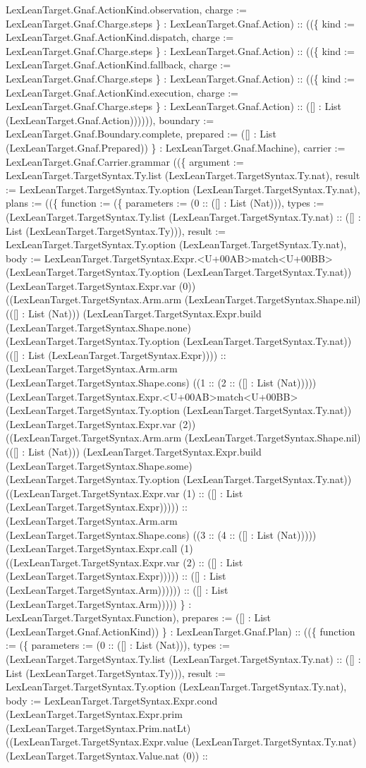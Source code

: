 \documentclass[11pt]{article}
\begin{document}
LexLeanTarget.Gnaf.ActionKind.observation, charge := LexLeanTarget.Gnaf.Charge.steps \} : LexLeanTarget.Gnaf.Action) :: ((\{ kind := LexLeanTarget.Gnaf.ActionKind.dispatch, charge := LexLeanTarget.Gnaf.Charge.steps \} : LexLeanTarget.Gnaf.Action) :: ((\{ kind := LexLeanTarget.Gnaf.ActionKind.fallback, charge := LexLeanTarget.Gnaf.Charge.steps \} : LexLeanTarget.Gnaf.Action) :: ((\{ kind := LexLeanTarget.Gnaf.ActionKind.execution, charge := LexLeanTarget.Gnaf.Charge.steps \} : LexLeanTarget.Gnaf.Action) :: ([] : List (LexLeanTarget.Gnaf.Action)))))), boundary := LexLeanTarget.Gnaf.Boundary.complete, prepared := ([] : List (LexLeanTarget.Gnaf.Prepared)) \} : LexLeanTarget.Gnaf.Machine), carrier := LexLeanTarget.Gnaf.Carrier.grammar ((\{ argument := LexLeanTarget.TargetSyntax.Ty.list (LexLeanTarget.TargetSyntax.Ty.nat), result := LexLeanTarget.TargetSyntax.Ty.option (LexLeanTarget.TargetSyntax.Ty.nat), plans := ((\{ function := (\{ parameters := (0 :: ([] : List (Nat))), types := (LexLeanTarget.TargetSyntax.Ty.list (LexLeanTarget.TargetSyntax.Ty.nat) :: ([] : List (LexLeanTarget.TargetSyntax.Ty))), result := LexLeanTarget.TargetSyntax.Ty.option (LexLeanTarget.TargetSyntax.Ty.nat), body := LexLeanTarget.TargetSyntax.Expr.<U+00AB>match<U+00BB> (LexLeanTarget.TargetSyntax.Ty.option (LexLeanTarget.TargetSyntax.Ty.nat)) (LexLeanTarget.TargetSyntax.Expr.var (0)) ((LexLeanTarget.TargetSyntax.Arm.arm (LexLeanTarget.TargetSyntax.Shape.nil) (([] : List (Nat))) (LexLeanTarget.TargetSyntax.Expr.build (LexLeanTarget.TargetSyntax.Shape.none) (LexLeanTarget.TargetSyntax.Ty.option (LexLeanTarget.TargetSyntax.Ty.nat)) (([] : List (LexLeanTarget.TargetSyntax.Expr)))) :: (LexLeanTarget.TargetSyntax.Arm.arm (LexLeanTarget.TargetSyntax.Shape.cons) ((1 :: (2 :: ([] : List (Nat))))) (LexLeanTarget.TargetSyntax.Expr.<U+00AB>match<U+00BB> (LexLeanTarget.TargetSyntax.Ty.option (LexLeanTarget.TargetSyntax.Ty.nat)) (LexLeanTarget.TargetSyntax.Expr.var (2)) ((LexLeanTarget.TargetSyntax.Arm.arm (LexLeanTarget.TargetSyntax.Shape.nil) (([] : List (Nat))) (LexLeanTarget.TargetSyntax.Expr.build (LexLeanTarget.TargetSyntax.Shape.some) (LexLeanTarget.TargetSyntax.Ty.option (LexLeanTarget.TargetSyntax.Ty.nat)) ((LexLeanTarget.TargetSyntax.Expr.var (1) :: ([] : List (LexLeanTarget.TargetSyntax.Expr))))) :: (LexLeanTarget.TargetSyntax.Arm.arm (LexLeanTarget.TargetSyntax.Shape.cons) ((3 :: (4 :: ([] : List (Nat))))) (LexLeanTarget.TargetSyntax.Expr.call (1) ((LexLeanTarget.TargetSyntax.Expr.var (2) :: ([] : List (LexLeanTarget.TargetSyntax.Expr))))) :: ([] : List (LexLeanTarget.TargetSyntax.Arm)))))) :: ([] : List (LexLeanTarget.TargetSyntax.Arm))))) \} : LexLeanTarget.TargetSyntax.Function), prepares := ([] : List (LexLeanTarget.Gnaf.ActionKind)) \} : LexLeanTarget.Gnaf.Plan) :: ((\{ function := (\{ parameters := (0 :: ([] : List (Nat))), types := (LexLeanTarget.TargetSyntax.Ty.list (LexLeanTarget.TargetSyntax.Ty.nat) :: ([] : List (LexLeanTarget.TargetSyntax.Ty))), result := LexLeanTarget.TargetSyntax.Ty.option (LexLeanTarget.TargetSyntax.Ty.nat), body := LexLeanTarget.TargetSyntax.Expr.cond (LexLeanTarget.TargetSyntax.Expr.prim (LexLeanTarget.TargetSyntax.Prim.natLt) ((LexLeanTarget.TargetSyntax.Expr.value (LexLeanTarget.TargetSyntax.Ty.nat) (LexLeanTarget.TargetSyntax.Value.nat (0)) :: 
\end{document}

